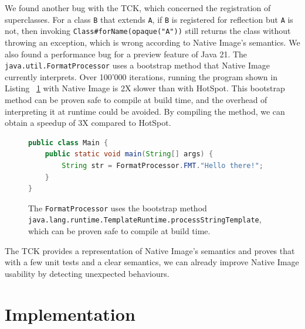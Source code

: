 We found another bug with the TCK, which concerned the registration of superclasses. For a class \verb|B| that extends \verb|A|, if \verb|B| is registered for reflection but \verb|A| is not, then invoking \verb|Class#forName(opaque("A"))| still returns the class without throwing an exception, which is wrong according to Native Image's semantics. 
We also found a performance bug for a preview feature of Java 21. The \verb|java.util.FormatProcessor| uses a bootstrap method that Native Image currently interprets. Over 100'000 iterations, running the program shown in Listing ~\ref{fig:format_processor} with Native Image is 2X slower than with HotSpot. This bootstrap method can be proven safe to compile at build time, and the overhead of interpreting it at runtime could be avoided. By compiling the method, we can obtain a speedup of 3X compared to HotSpot.

\begin{figure}[ht]
    \centering
\begin{lstlisting}[language=Java]
public class Main {
    public static void main(String[] args) {
        String str = FormatProcessor.FMT."Hello there!";
    }
}
\end{lstlisting}
    \caption{The \texttt{FormatProcessor} uses the bootstrap method \texttt{java.lang.runtime.TemplateRuntime.processStringTemplate}, which can be proven safe to compile at build time. }
    \label{fig:format_processor}
\end{figure}

The TCK provides a representation of Native Image's semantics and proves that with a few unit tests and a clear semantics, we can already improve Native Image usability by detecting unexpected behaviours.


\chapter{Implementation}

